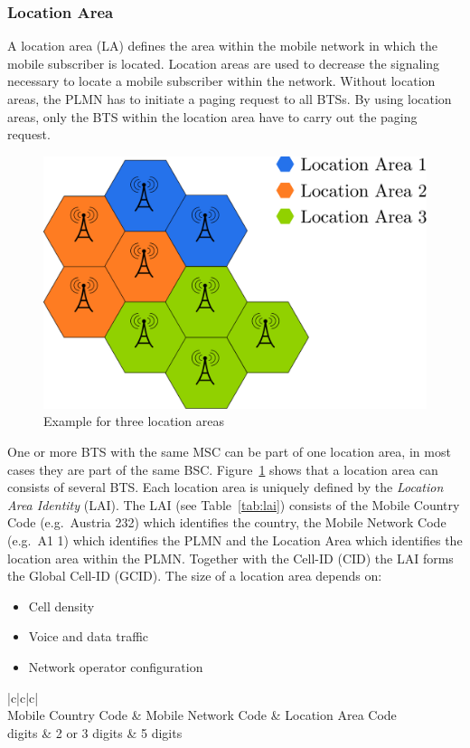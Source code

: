 \documentclass[master,english]{hgbthesis}
\begin{document}
\subsubsection{Location Area}
A location area (LA) defines the area within the mobile network in which the mobile subscriber is located. Location areas are used to decrease the signaling necessary to locate a mobile subscriber within the network. Without location areas, the PLMN has to initiate a paging request to all BTSs. By using location areas, only the BTS within the location area have to carry out the paging request.
%
\begin{figure}
	\centering
	\includegraphics[width=0.7\linewidth]{./images/locationarea}
	\caption{Example for three location areas}
	\label{fig:locationarea}
\end{figure}
One or more BTS with the same MSC can be part of one location area, in most cases they are part of the same BSC. Figure~\ref{fig:locationarea} shows that a location area can consists of several BTS. Each location area is uniquely defined by the \emph{Location Area Identity} (LAI). The LAI (see Table~\ref{tab:lai}) consists of the Mobile Country Code (e.g.\ Austria 232) which identifies the country, the Mobile Network Code (e.g.\ A1 1) which identifies the PLMN and the Location Area which identifies the location area within the PLMN. Together with the Cell-ID (CID) the LAI forms the Global Cell-ID (GCID).
The size of a location area depends on:
\begin{itemize}
	\item Cell density
	\item Voice and data traffic
	\item Network operator configuration
\end{itemize}
\begin{table}
	\begin{tabular}{|c|c|c|}
		\hline  {} \\
		\hline Mobile Country Code & Mobile Network Code & Location Area Code \\
		 digits            & 2 or 3 digits       & 5 digits           \\
		\hline
	\end{tabular}
	\caption{Parts of the Location Area Identity }
	\label{tab:lai}
\end{table}
\end{document}
